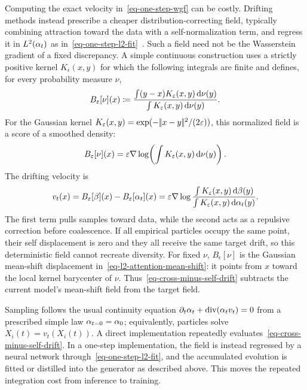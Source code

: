 Computing the exact velocity in~\eqref{eq-one-step-wgf} can be costly. Drifting methods instead prescribe a cheaper distribution-correcting field, typically combining attraction toward the data with a self-normalization term, and regress it in $L^2(\alpha_t)$ as in~\eqref{eq-one-step-l2-fit}~\cite{Deng2026Drifting,Gretton2026DriftingWGF}. Such a field need not be the Wasserstein gradient of a fixed discrepancy. A simple continuous construction uses a strictly positive kernel $K_\epsilon(x,y)$ for which the following integrals are finite and defines, for every probability measure $\nu$,
\begin{equation}\label{eq-normalized-kernel-drift}
	B_\varepsilon[\nu](x)
	\coloneqq
	\frac{\int (y-x)K_\varepsilon(x,y)\,\mathrm{d}\nu(y)}
	     {\int K_\varepsilon(x,y)\,\mathrm{d}\nu(y)}.
\end{equation}
For the Gaussian kernel
$K_\varepsilon(x,y)=\exp(-|\!| x-y |\!|^2/(2\varepsilon))$, this normalized field is a score of a smoothed density:
\begin{equation}\label{eq-normalized-kernel-score}
	B_\varepsilon[\nu](x)
	=
	\varepsilon\nabla\log\!\left(\int K_\varepsilon(x,y)\,\mathrm{d}\nu(y)\right).
\end{equation}
The drifting velocity is
\begin{equation}\label{eq-cross-minus-self-drift}
	v_t(x)=B_\varepsilon[\beta](x)-B_\varepsilon[\alpha_t](x)
	=
	\varepsilon\nabla\log
	\frac{\int K_\varepsilon(x,y)\,\mathrm{d}\beta(y)}
	     {\int K_\varepsilon(x,y)\,\mathrm{d}\alpha_t(y)}.
\end{equation}
The first term pulls samples toward data, while the second acts as a repulsive correction before coalescence. If all empirical particles occupy the same point, their self displacement is zero and they all receive the same target drift, so this deterministic field cannot recreate diversity. For fixed $\nu$, $B_\epsilon[\nu]$ is the Gaussian mean-shift displacement in~\eqref{eq-l2-attention-mean-shift}: it points from $x$ toward the local kernel barycenter of $\nu$. Thus~\eqref{eq-cross-minus-self-drift} subtracts the current model's mean-shift field from the target field.

Sampling follows the usual continuity equation $\partial_t\alpha_t+\operatorname{div}(\alpha_t v_t)=0$ from a prescribed simple law $\alpha_{t=0}=\alpha_0$; equivalently, particles solve $\dot X_i(t)=v_t(X_i(t))$. A direct implementation repeatedly evaluates~\eqref{eq-cross-minus-self-drift}. In a one-step implementation, the field is instead regressed by a neural network through~\eqref{eq-one-step-l2-fit}, and the accumulated evolution is fitted or distilled into the generator as described above. This moves the repeated integration cost from inference to training.


